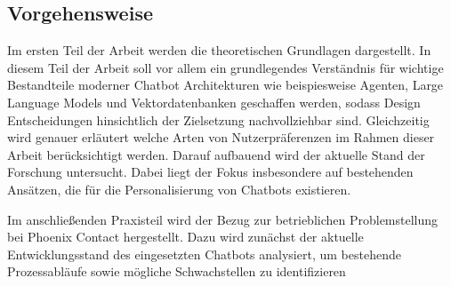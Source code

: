 \subsection{Vorgehensweise}

Im ersten Teil der Arbeit werden die theoretischen Grundlagen dargestellt. In diesem Teil der Arbeit soll vor allem ein grundlegendes Verständnis für wichtige Bestandteile moderner Chatbot Architekturen wie beispiesweise Agenten, Large Language Models und Vektordatenbanken geschaffen werden, sodass Design Entscheidungen hinsichtlich der Zielsetzung nachvollziehbar sind. Gleichzeitig wird genauer erläutert welche Arten von Nutzerpräferenzen im Rahmen dieser Arbeit berücksichtigt werden. Darauf aufbauend wird der aktuelle Stand der Forschung untersucht. Dabei liegt der Fokus insbesondere auf bestehenden Ansätzen, die für die Personalisierung von Chatbots existieren.

Im anschließenden Praxisteil wird der Bezug zur betrieblichen Problemstellung bei Phoenix Contact hergestellt. Dazu wird zunächst der aktuelle Entwicklungsstand des eingesetzten Chatbots analysiert, um bestehende Prozessabläufe sowie mögliche Schwachstellen zu identifizieren